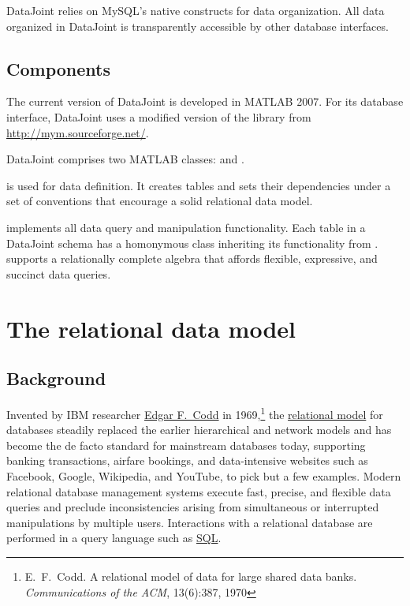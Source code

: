 \documentclass[10pt]{article}
\begin{document}
DataJoint relies on MySQL's native constructs for data organization.  All data organized in DataJoint is transparently accessible by other database interfaces.

\subsection{Components}
The current version of DataJoint is developed in MATLAB 2007. For its database interface, DataJoint uses a modified version of the   library from \url{http://mym.sourceforge.net/}.

DataJoint comprises two MATLAB classes:  and .  

 is used for data definition. It creates tables and sets their dependencies under a set of conventions that encourage a solid relational data model. 

 implements all data query and manipulation functionality. Each table in a DataJoint schema has a homonymous class inheriting its functionality from .  supports a relationally complete algebra that affords flexible, expressive, and succinct data queries.

\section{The relational data model}
\subsection{Background}
Invented by IBM researcher \href{http://en.wikipedia.org/wiki/Edgar_F._Codd}{Edgar F.~Codd} in 1969,\footnote{E.~F.~Codd. A relational model of data for large shared data banks. {\em Communications of the ACM}, 13(6):387, 1970} the \href{http://en.wikipedia.org/wiki/Relational_model}{relational model} for databases steadily replaced the earlier hierarchical and network models and has become the de facto standard for mainstream databases today, supporting banking transactions, airfare bookings, and data-intensive websites such as Facebook, Google, Wikipedia, and YouTube, to pick but a few examples.  Modern relational database management systems  execute fast, precise, and flexible data queries and preclude inconsistencies arising from simultaneous or interrupted manipulations by multiple users. Interactions with a relational database are performed in a query language such as \href{http://en.wikipedia.org/wiki/SQL}{SQL}. 
\end{document}
